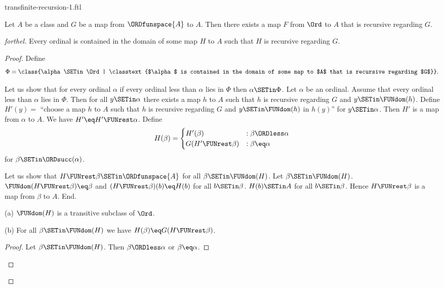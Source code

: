 \documentclass{naproche-library}
\begin{document}
\begin{smodule}[title=Transfinite Recursion I]{transfinite-recursion-1.ftl}
  
\begin{theorem}[forthel,title=Transfinite Recursion Theorem: Existence,id=transfinite-recursion_existence]
  Let $A$ be a class and $G$ be a map from $\ORDfunspace{A}$ to $A$.
  Then there exists a map $F$ from $\Ord$ to $A$ that is recursive regarding $G$.
\end{theorem}
\begin{proof}[forthel]
  Every ordinal is contained in the domain of some map $H$ to $A$ such that $H$ is recursive regarding $G$.
  \begin{proof}
    Define \[ \Phi = \class{\alpha \SETin \Ord | \classtext{$\alpha$ is contained in the domain of some map to $A$ that is recursive regarding $G$}}. \]

    Let us show that for every ordinal $\alpha$ if every ordinal less than $\alpha$ lies in $\Phi$ then $\alpha \SETin \Phi$.
      Let $\alpha$ be an ordinal.
      Assume that every ordinal less than $\alpha$ lies in $\Phi$.
      Then for all $y \SETin \alpha$ there exists a map $h$ to $A$ such that $h$ is recursive regarding $G$ and $y \SETin \FUNdom(h)$.
      Define $H'(y) =$ ``choose a map $h$ to $A$ such that $h$ is recursive regarding $G$ and $y \SETin \FUNdom(h)$ in $h(y)$'' for $y \SETin \alpha$.
      Then $H'$ is a map from $\alpha$ to $A$.
      We have $H' \eq H' \FUNrest \alpha$.
      Define \[ H(\beta) =
        \begin{cases}
          H'(\beta)                 & : \beta \ORDless \alpha \\
          G(H' \FUNrest \beta)  & : \beta \eq \alpha
        \end{cases} \]
      for $\beta \SETin \ORDsucc(\alpha)$.
      
      Let us show that $H \FUNrest \beta \SETin \ORDfunspace{A}$ for all $\beta \SETin \FUNdom(H)$.
        Let $\beta \SETin \FUNdom(H)$.
        $\FUNdom(H \FUNrest \beta) \eq \beta$ and $(H \FUNrest \beta)(b) \eq H(b)$ for all $b \SETin \beta$.
        $H(b) \SETin A$ for all $b \SETin \beta$.
        Hence $H \FUNrest \beta$ is a map from $\beta$ to $A$.
      End.

      (a) $\FUNdom(H)$ is a transitive subclass of $\Ord$.

      (b) For all $\beta \SETin \FUNdom(H)$ we have $H(\beta) \eq G(H \FUNrest \beta)$.
      \begin{proof}
        Let $\beta \SETin \FUNdom(H)$.
        Then $\beta \ORDless \alpha$ or $\beta \eq \alpha$.


\end{proof}
\end{proof}
\end{proof}
\end{smodule}
\end{document}
